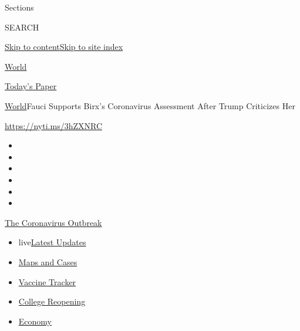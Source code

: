 Sections

SEARCH

\protect\hyperlink{site-content}{Skip to
content}\protect\hyperlink{site-index}{Skip to site index}

\href{https://www.nytimes3xbfgragh.onion/section/world}{World}

\href{https://myaccount.nytimes3xbfgragh.onion/auth/login?response_type=cookie\&client_id=vi}{}

\href{https://www.nytimes3xbfgragh.onion/section/todayspaper}{Today's
Paper}

\href{/section/world}{World}\textbar{}Fauci Supports Birx's Coronavirus
Assessment After Trump Criticizes Her

\url{https://nyti.ms/3hZXNRC}

\begin{itemize}
\item
\item
\item
\item
\item
\item
\end{itemize}

\href{https://www.nytimes3xbfgragh.onion/news-event/coronavirus?action=click\&pgtype=Article\&state=default\&region=TOP_BANNER\&context=storylines_menu}{The
Coronavirus Outbreak}

\begin{itemize}
\tightlist
\item
  live\href{https://www.nytimes3xbfgragh.onion/2020/08/03/world/coronavirus-covid-19.html?action=click\&pgtype=Article\&state=default\&region=TOP_BANNER\&context=storylines_menu}{Latest
  Updates}
\item
  \href{https://www.nytimes3xbfgragh.onion/interactive/2020/us/coronavirus-us-cases.html?action=click\&pgtype=Article\&state=default\&region=TOP_BANNER\&context=storylines_menu}{Maps
  and Cases}
\item
  \href{https://www.nytimes3xbfgragh.onion/interactive/2020/science/coronavirus-vaccine-tracker.html?action=click\&pgtype=Article\&state=default\&region=TOP_BANNER\&context=storylines_menu}{Vaccine
  Tracker}
\item
  \href{https://www.nytimes3xbfgragh.onion/2020/08/02/us/covid-college-reopening.html?action=click\&pgtype=Article\&state=default\&region=TOP_BANNER\&context=storylines_menu}{College
  Reopening}
\item
  \href{https://www.nytimes3xbfgragh.onion/live/2020/08/03/business/stock-market-today-coronavirus?action=click\&pgtype=Article\&state=default\&region=TOP_BANNER\&context=storylines_menu}{Economy}
\end{itemize}

